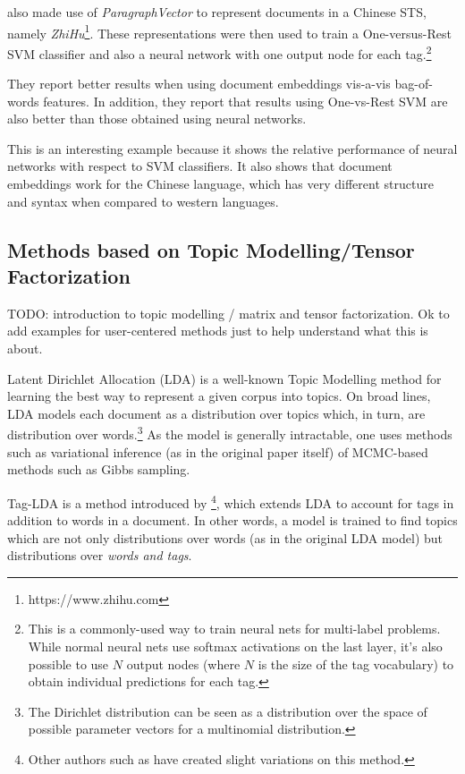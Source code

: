 \cite{tao_yao_2016} also made use of \textit{ParagraphVector} to represent documents in a Chinese STS, namely \textit{ZhiHu}\footnote{https://www.zhihu.com}. These representations were then used to train a One-versus-Rest SVM classifier and also a neural network with one output node for each tag.\footnote{This is a commonly-used way to train neural nets for multi-label problems. While normal neural nets use softmax activations on the last layer, it's also possible to use $N$ output nodes (where $N$ is the size of the tag vocabulary) to obtain individual predictions for each tag.}

They report better results when using document embeddings vis-a-vis bag-of-words features. In addition, they report that results using One-vs-Rest SVM are also better than those obtained using neural networks.

This is an interesting example because it shows the relative performance of neural networks with respect to SVM classifiers. It also shows that document embeddings work for the Chinese language, which has very different structure and syntax when compared to western languages.

\subsection{Methods based on Topic Modelling/Tensor Factorization}

{\color{red} TODO: introduction to topic modelling / matrix and tensor factorization. Ok to add examples for user-centered methods just to help understand what this is about.}

Latent Dirichlet Allocation (LDA) \citep{blei_etal_2003} is a well-known Topic Modelling method for learning the best way to represent a given corpus into topics. On broad lines, LDA models each document as a distribution over topics which, in turn, are distribution over words.\footnote{The Dirichlet distribution can be seen as a distribution over the space of possible parameter vectors for a multinomial distribution.} As the model is generally intractable, one uses methods such as variational inference (as in the original paper itself) of MCMC-based methods such as Gibbs sampling.

Tag-LDA is a method introduced by \cite{si_sun_2008}\footnote{Other authors such as \cite{hu_etal_2012} have created slight variations on this method.}, which extends LDA to account for tags in addition to words in a document. In other words, a model is trained to find topics which are not only distributions over words (as in the original LDA model) but distributions over \textit{words and tags}. 

